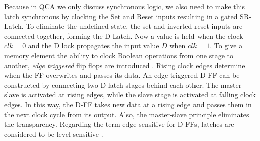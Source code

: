 Because in QCA we only discuss synchronous logic, we also need to make this latch synchronous by clocking the Set and Reset inputs resulting in a gated SR-Latch. To eliminate the undefined state, the set and inverted reset inputs are connected together, forming the D-Latch. Now a value is held when the clock $clk=0$ and the D lock propagates the input value $D$ when $clk=1$. To give a memory element the ability to clock Boolean operations from one stage to another, \textit{edge triggered} flip flops are introduced . Rising clock edges determine when the FF overwrites and passes its data. An edge-triggered D-FF can be constructed by connecting two D-latch stages behind each other. The master slave is activated at rising edges, while the slave stage is activated at falling clock edges. In this way, the D-FF takes new data at a rising edge and passes them in the next clock cycle from its output. Also, the master-slave principle eliminates the transparency. Regarding the term edge-sensitive for D-FFs, latches are considered to be level-sensitive \cite{hawkins2012cmos}.\\

